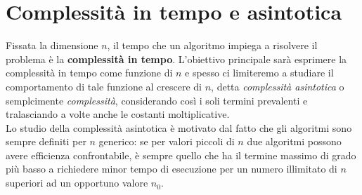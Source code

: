 \documentclass[12pt]{report}
\begin{document}
   	\section{Complessità in tempo e asintotica}
   	Fissata la dimensione $n$, il tempo che un algoritmo impiega a risolvere il problema è la \textbf{complessità in tempo}. L'obiettivo principale sarà esprimere la complessità in tempo come funzione di $n$ e spesso ci limiteremo a studiare il comportamento di tale funzione al crescere di $n$, detta \textit{complessità asintotica} o semplcimente \textit{complessità}, considerando così i soli termini prevalenti e tralasciando a volte anche le costanti moltiplicative. \\
   	Lo studio della complessità asintotica è motivato dal fatto che gli algoritmi sono sempre definiti per $n$ generico: se per valori piccoli di $n$ due algoritmi possono avere efficienza confrontabile, è sempre quello che ha il termine massimo di grado più basso a richiedere minor tempo di esecuzione per un numero illimitato di $n$ superiori ad un opportuno valore $n_0$.
\end{document}
